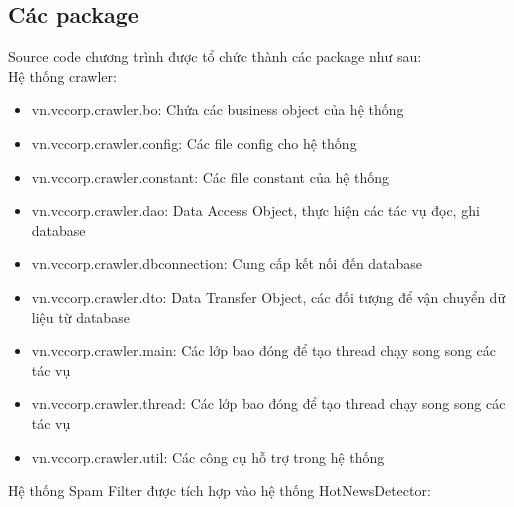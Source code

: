 	\subsection{Các package}
	Source code chương trình được tổ chức thành các package như sau:\\
	Hệ thống crawler:
	\begin{itemize}
		\item vn.vccorp.crawler.bo: Chứa các business object của hệ thống
		\item vn.vccorp.crawler.config: Các file config cho hệ thống
		\item vn.vccorp.crawler.constant: Các file constant của hệ thống
		\item vn.vccorp.crawler.dao: Data Access Object, thực hiện các tác vụ đọc, ghi database
		\item vn.vccorp.crawler.dbconnection: Cung cấp kết nối đến database
		\item vn.vccorp.crawler.dto: Data Transfer Object, các đối tượng để vận chuyển dữ liệu từ database
		\item vn.vccorp.crawler.main: Các lớp bao đóng để tạo thread chạy song song các tác vụ
		\item vn.vccorp.crawler.thread: Các lớp bao đóng để tạo thread chạy song song các tác vụ
		\item vn.vccorp.crawler.util: Các công cụ hỗ trợ trong hệ thống
	\end{itemize}
	Hệ thống Spam Filter được tích hợp vào hệ thống HotNewsDetector:
